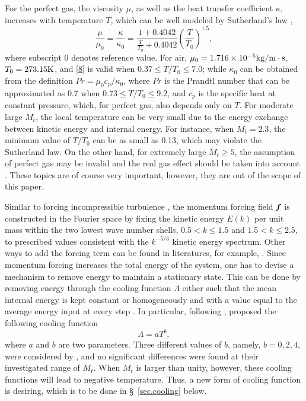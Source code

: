 \documentclass[review]{elsarticle}
\newcommand{\fr}{\frac}
\newcommand{\er}{\eqref}
\newcommand{\ka}{\kappa}
\newcommand{\pf}{\textbf{\emph{f}}}
\begin{document}
For the perfect gas, the viscosity $\mu$, as well as the heat transfer coefficient $\ka$, increases with temperature $T$, which can be well modeled by Sutherland's law \citep{Sutherland1893},
\begin{equation}\label{8}
  \fr{\mu}{\mu_0} = \fr{\ka}{\ka_0} = \fr{1 + 0.4042}{\displaystyle \fr{T}{T_0} +0.4042} \left( \fr{T}{T_0} \right)^{1.5},
\end{equation}
where subscript 0 denotes reference value. For air, $\mu_0 = 1.716 \times 10^{-5} \rm kg/ m \cdot s$, $T_0 = 273.15 \rm K$, and \er{8} is valid when $0.37 \le T/T_0 \le 7.0$; while $\ka_0$ can be obtained from the definition $Pr = \mu_0 c_p/\ka_0$, where $Pr$ is the Prandtl number that can be approximated as 0.7 when $0.73 \le T/T_0 \le 9.2$, and $c_p$ is the specific heat at constant pressure, which, for perfect gas, also depends only on $T$. For moderate large $M_t$, the local temperature can be very small due to the energy exchange between kinetic energy and internal energy. For instance, when $M_t = 2.3$, the minimum value of $T/T_0$ can be as small as 0.13, which may violate the Sutherland law. On the other hand, for extremely large $M_t \ge 5$, the assumption of perfect gas may be invalid and the real gas effect should be taken into account \citep{Lunev2009}. These topics are of course very important, however, they are out of the scope of this paper.

Similar to forcing incompressible turbulence \citep{Chen1993}, the momentum forcing field $\pf$ is constructed in the Fourier space by fixing the kinetic energy $E(k)$ per unit mass within the two lowest wave number shells, $0.5 < k \le 1.5$ and $1.5 < k \le 2.5$, to prescribed values consistent with the $k^{-5/3}$ kinetic energy spectrum. Other ways to add the forcing term can be found in literatures, for example, \citet{Jagannathan2016}. Since momentum forcing increases the total energy of the system, one has to devise a mechanism to remove energy to maintain a stationary state. This can be done by removing energy through the cooling function $\Lambda$ either such that the mean internal energy is kept constant or homogeneously and with a value equal to the average energy input at every step \citep{Jagannathan2016}. In particular, following \citet{Passot1995}, \citet{Wang2010} proposed the following cooling function
\begin{equation}\label{38}
  \Lambda = a T^b,
\end{equation}
where $a$ and $b$ are two parameters. Three different values of $b$, namely, $b = 0, 2, 4$, were considered by \citet{Wang2010}, and no significant differences were found at their investigated range of $M_t$. When $M_t$ is larger than unity, however, these cooling functions will lead to negative temperature. Thus, a new form of cooling function is desiring, which is to be done in \S~\ref{sec.cooling} below.
\end{document}
